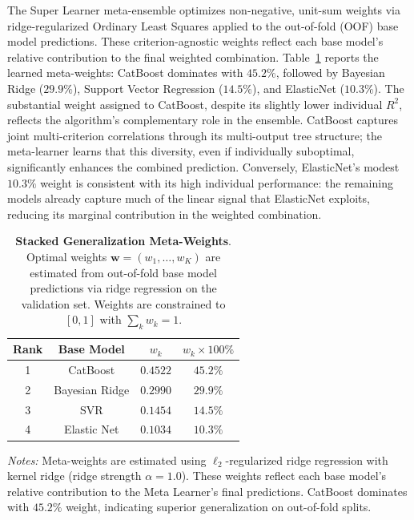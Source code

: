 \documentclass[12pt,a4paper]{article}
\begin{document}
The Super Learner meta-ensemble optimizes non-negative, unit-sum weights via ridge-regularized Ordinary Least Squares applied to the out-of-fold (OOF) base model predictions. These criterion-agnostic weights reflect each base model's relative contribution to the final weighted combination. Table~\ref{tab:meta_weights} reports the learned meta-weights: CatBoost dominates with $45.2\%$, followed by Bayesian Ridge ($29.9\%$), Support Vector Regression ($14.5\%$), and ElasticNet ($10.3\%$). The substantial weight assigned to CatBoost, despite its slightly lower individual $R^2$, reflects the algorithm's complementary role in the ensemble. CatBoost captures joint multi-criterion correlations through its multi-output tree structure; the meta-learner learns that this diversity, even if individually suboptimal, significantly enhances the combined prediction. Conversely, ElasticNet's modest $10.3\%$ weight is consistent with its high individual performance: the remaining models already capture much of the linear signal that ElasticNet exploits, reducing its marginal contribution in the weighted combination.

\begin{table}[H]
\centering
\caption{%
    \textbf{Stacked Generalization Meta-Weights}.
    Optimal weights $\mathbf{w} = (w_1, \ldots, w_K)$ are estimated from out-of-fold base model predictions 
    via ridge regression on the validation set. Weights are constrained to $[0, 1]$ with $\sum_k w_k = 1$.
}
\label{tab:meta_weights}
\small
\begin{tabular}{cccc}
\toprule
\textbf{Rank} & \textbf{Base Model} & $w_k$ & $w_k \times 100\%$ \\
\midrule
1 & CatBoost           & $0.4522$ & $45.2\%$ \\
2 & Bayesian Ridge     & $0.2990$ & $29.9\%$ \\
3 & SVR& $0.1454$ & $14.5\%$ \\
4 & Elastic Net        & $0.1034$ & $10.3\%$ \\
\bottomrule
\end{tabular}
\begin{flushleft}
\footnotesize
\textit{Notes:} 
Meta-weights are estimated using $\ell_2$-regularized ridge regression with kernel ridge (ridge strength $\alpha = 1.0$).
These weights reflect each base model's relative contribution to the Meta Learner's final predictions.
CatBoost dominates with $45.2\%$ weight, indicating superior generalization on out-of-fold splits.
\end{flushleft}
\end{table}
\end{document}
